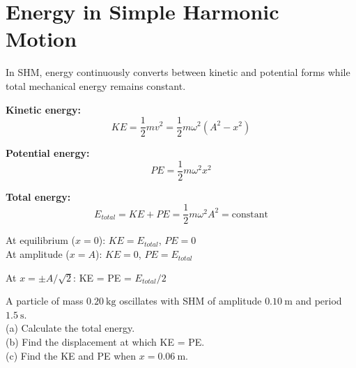 \section{Energy in Simple Harmonic Motion}

\begin{lawbox}
In SHM, energy continuously converts between kinetic
and potential forms while total mechanical energy
remains constant.

\textbf{Kinetic energy:}
\[
  KE = \frac{1}{2}mv^2
  = \frac{1}{2}m\omega^2(A^2 - x^2)
\]

\textbf{Potential energy:}
\[
  PE = \frac{1}{2}m\omega^2 x^2
\]

\textbf{Total energy:}
\[
  E_{total} = KE + PE = \frac{1}{2}m\omega^2 A^2
  = \text{constant}
\]

At equilibrium ($x=0$): $KE = E_{total}$, $PE = 0$\\
At amplitude ($x=A$): $KE = 0$, $PE = E_{total}$
\end{lawbox}

\begin{diagbox}
\begin{center}
\end{center}
\small At $x = \pm A/\sqrt{2}$: KE = PE = $E_{total}/2$
\end{diagbox}

\begin{examplebox}[7.4]
A particle of mass $0.20\ \text{kg}$ oscillates with
SHM of amplitude $0.10\ \text{m}$ and period
$1.5\ \text{s}$.\\
(a) Calculate the total energy.\\
(b) Find the displacement at which KE = PE.\\
(c) Find the KE and PE when $x = 0.06\ \text{m}$.
\end{examplebox}

